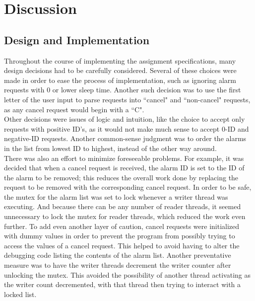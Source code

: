 \documentclass[11pt]{article}
\newcommand{\forceindent}{\leavevmode{\parindent=1em\indent}}
\begin{document}
\section{Discussion}
	\subsection{Design and Implementation}
	
\forceindent Throughout the course of implementing the assignment specifications, many design decisions had to be carefully considered. Several of these choices were made in order to ease the process of implementation, such as ignoring alarm requests with 0 or lower sleep time. Another such decision was to use the first letter of the user input to parse requests into ``cancel" and ``non-cancel" requests, as any cancel request would begin with a ``C".\\

	Other decisions were issues of logic and intuition, like the choice to accept only requests with positive ID’s, as it would not make much sense to accept 0-ID and negative-ID requests. Another common-sense judgment was to order the alarms in the list from lowest ID to highest, instead of the other way around.\\
	
	There was also an effort to minimize foreseeable problems. For example, it was decided that when a cancel request is received, the alarm ID is set to the ID of the alarm to be removed; this reduces the overall work done by replacing the request to be removed with the corresponding cancel request. In order to be safe, the mutex for the alarm list was set to lock whenever a writer thread was executing. And because there can be any number of reader threads, it seemed unnecessary to lock the mutex for reader threads, which reduced the work even further. To add even another layer of caution, cancel requests were initialized with dummy values in order to prevent the program from possibly trying to access the values of a cancel request. This helped to avoid having to alter the debugging code listing the contents of the alarm list. Another preventative measure was to have the writer threads decrement the writer counter after unlocking the mutex. This avoided the possibility of another thread activating as the writer count decremented, with that thread then trying to interact with a locked list.\\
	
\end{document}
